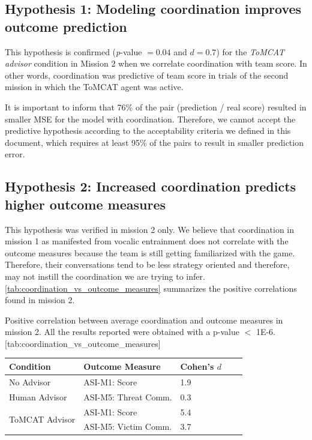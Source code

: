 \subsection{Hypothesis 1: Modeling coordination improves outcome prediction}

This hypothesis is confirmed (\emph{p}-value $= 0.04$ and $d = 0.7$) for the
\emph{ToMCAT advisor} condition in Mission 2 when we correlate coordination
with team score.  In other words, coordination was predictive of team score in
trials of the second mission in which the ToMCAT agent was active.

It is important to inform that 76\% of the pair (prediction / real score)
resulted in smaller MSE for the model with coordination. Therefore, we cannot
accept the predictive hypothesis according to the acceptability criteria we
defined in this document, which requires at least 95\% of the pairs to result
in smaller prediction error.

\subsection{Hypothesis 2: Increased coordination predicts higher outcome measures}

This hypothesis was verified in mission 2 only. We believe that coordination in
mission 1 as manifested from vocalic entrainment does not correlate with the
outcome measures because the team is still getting familiarized with the game.
Therefore, their conversations tend to be less strategy oriented and therefore,
may not instill the coordination we are trying to infer.
\autoref{tab:coordination_vs_outcome_measures} summarizes the positive
correlations found in mission 2.

\begin{table}[h]
	\centering
    \begin{sidecaption}{%
        Positive correlation between average coordination and outcome measures
        in mission 2. All the results reported were obtained with a p-value $<$
        1E-6.
    }[tab:coordination_vs_outcome_measures]
	\begin{tabular}{lllll}
		\toprule
		\textbf{Condition} & \textbf{Outcome Measure} & \textbf{Cohen's $d$}\\
		\midrule
		No Advisor                      & ASI-M1: Score        & 1.9\\
		Human Advisor                   & ASI-M5: Threat Comm. & 0.3\\
		\multirow{2}{*}{ToMCAT Advisor} & ASI-M1: Score        & 5.4\\
				                        & ASI-M5: Victim Comm. & 3.7\\
		\bottomrule
	\end{tabular}
\end{sidecaption}
\end{table}

